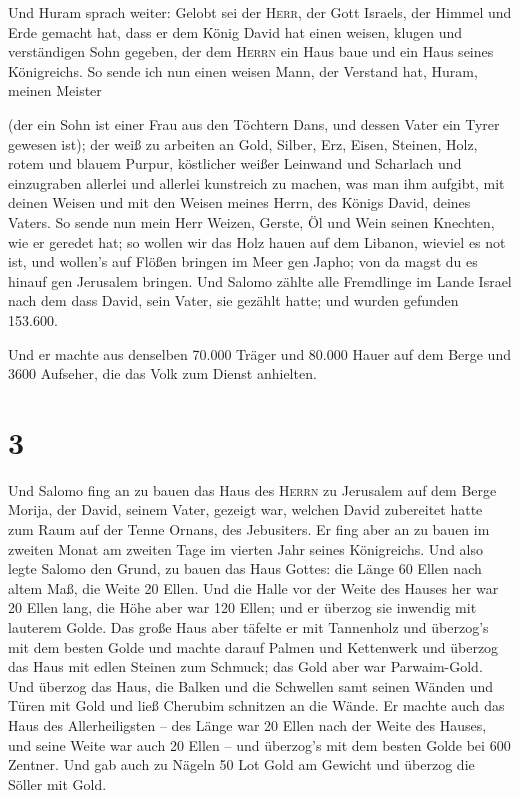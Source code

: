  Und Huram sprach weiter: Gelobt sei der \textsc{Herr},
der Gott Israels, der Himmel und Erde gemacht hat, dass er dem König
David hat einen weisen, klugen und verständigen Sohn gegeben, der dem
\textsc{Herrn} ein Haus baue und ein Haus seines Königreichs.
 So sende ich nun einen weisen Mann, der Verstand hat,
Huram, meinen Meister

 (der ein Sohn ist einer Frau aus den Töchtern Dans, und
dessen Vater ein Tyrer gewesen ist); der weiß zu arbeiten an Gold,
Silber, Erz, Eisen, Steinen, Holz, rotem und blauem Purpur, köstlicher
weißer Leinwand und Scharlach und einzugraben allerlei und allerlei
kunstreich zu machen, was man ihm aufgibt, mit deinen Weisen und mit den
Weisen meines Herrn, des Königs David, deines Vaters.  So
sende nun mein Herr Weizen, Gerste, Öl und Wein seinen Knechten, wie er
geredet hat;  so wollen wir das Holz hauen auf dem
Libanon, wieviel es not ist, und wollen's auf Flößen bringen im Meer gen
Japho; von da magst du es hinauf gen Jerusalem bringen. 
Und Salomo zählte alle Fremdlinge im Lande Israel nach dem dass David,
sein Vater, sie gezählt hatte; und wurden gefunden 153.600.

 Und er machte aus denselben 70.000 Träger und 80.000
Hauer auf dem Berge und 3600 Aufseher, die das Volk zum Dienst
anhielten.

\hypertarget{section-2}{%
\section{3}\label{section-2}}

 Und Salomo fing an zu bauen das Haus des \textsc{Herrn}
zu Jerusalem auf dem Berge Morija, der David, seinem Vater, gezeigt war,
welchen David zubereitet hatte zum Raum auf der Tenne Ornans, des
Jebusiters.  Er fing aber an zu bauen im zweiten Monat am
zweiten Tage im vierten Jahr seines Königreichs.  Und also
legte Salomo den Grund, zu bauen das Haus Gottes: die Länge 60 Ellen
nach altem Maß, die Weite 20 Ellen.  Und die Halle vor der
Weite des Hauses her war 20 Ellen lang, die Höhe aber war 120 Ellen; und
er überzog sie inwendig mit lauterem Golde.  Das große
Haus aber täfelte er mit Tannenholz und überzog's mit dem besten Golde
und machte darauf Palmen und Kettenwerk  und überzog das
Haus mit edlen Steinen zum Schmuck; das Gold aber war Parwaim-Gold.
 Und überzog das Haus, die Balken und die Schwellen samt
seinen Wänden und Türen mit Gold und ließ Cherubim schnitzen an die
Wände.  Er machte auch das Haus des Allerheiligsten -- des
Länge war 20 Ellen nach der Weite des Hauses, und seine Weite war auch
20 Ellen -- und überzog's mit dem besten Golde bei 600 Zentner.
 Und gab auch zu Nägeln 50 Lot Gold am Gewicht und überzog
die Söller mit Gold.

